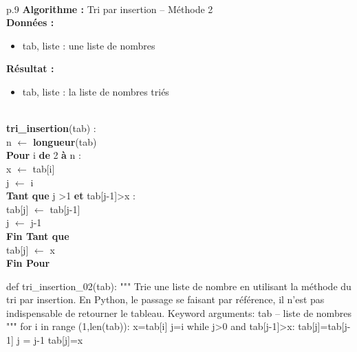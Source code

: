 \documentclass[10pt,fleqn]{article} %
\newcommand{\tsf}[1]{\small{\textsf{#1}}}
\begin{document}
\begin{pseudo}
~\\
\begin{minipage}[c]{.48\linewidth}
\begin{tabular}{p{.9\textwidth}}
\hline
\textbf{Algorithme :} Tri par insertion -- Méthode 2\\
\hline
\textbf{Données :}
\begin{itemize}
\item \tsf{tab}, liste : une liste de nombres
\end{itemize}
\textbf{Résultat :} 
\begin{itemize}
\item \tsf{tab}, liste : la liste de nombres triés
\end{itemize}
\\
\textbf{tri\_insertion}(\tsf{tab}) :\\
\hspace{.4cm} \tsf{n} $\leftarrow$ \textbf{longueur}(\tsf{tab}) \\
\hspace{.4cm}\textbf{Pour} \tsf{i} \textbf{de} 2 \textbf{à} \tsf{n} : \\
\hspace{.8cm} \tsf{x} $\leftarrow$ \tsf{tab[i]} \\
\hspace{.8cm} \tsf{j} $\leftarrow$ \tsf{i} \\
\hspace{.8cm}\textbf{Tant que} \tsf{j >1} \textbf{et} \tsf{tab[j-1]>x}  : \\
\hspace{1.2cm} \tsf{tab[j]} $\leftarrow$ \tsf{tab[j-1]} \\
\hspace{1.2cm} \tsf{j} $\leftarrow$ \tsf{j-1} \\
\hspace{.8cm}\textbf{Fin Tant que} \\
\hspace{.8cm} \tsf{tab[j]} $\leftarrow$ \tsf{x} \\
\hspace{.4cm}\textbf{Fin Pour} \\
\hline
\end{tabular}
\end{minipage} \hfill
\begin{minipage}[c]{.48\linewidth}
\begin{python}
def tri_insertion_02(tab):
    """ 
    Trie une liste de nombre en utilisant la méthode 
    du tri par insertion.
    En Python, le passage se faisant par référence, 
    il n'est pas indispensable de retourner le tableau.
    Keyword arguments:
    tab -- liste de nombres
    """
    for i in range (1,len(tab)):
        x=tab[i]
        j=i
        while j>0 and tab[j-1]>x:
            tab[j]=tab[j-1]
            j = j-1
        tab[j]=x
\end{python}
\end{minipage}
\end{pseudo}
\end{document}
